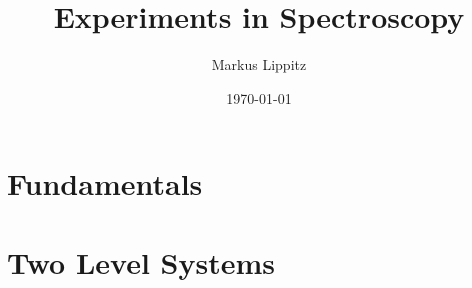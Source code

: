 \documentclass[notoc,nofonts,a4paper,oneside,nobib]{tufte-book}
\begin{document}
\title{Experiments in Spectroscopy}

\author{Markus Lippitz}
\date{\today}


\maketitle



\tableofcontents
%
\part{Fundamentals}







%
%
%
%
%
%
%
%
%
%
%
%
%
\part{Two Level Systems}

%


%
%


%
%
%
%
%
%
%
%
%
%
%



\printbibliography
\end{document}
